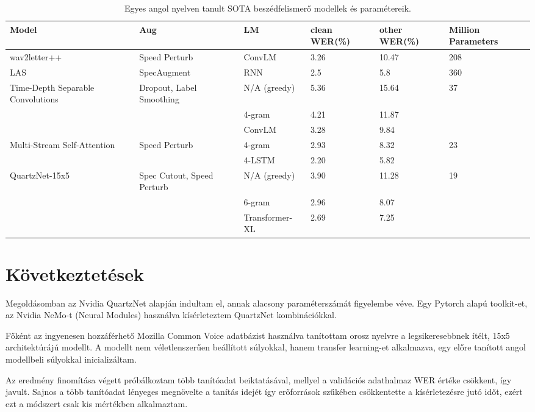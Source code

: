\begin{table}[ht]
	\footnotesize
	\centering
	\begin{tabular}{ p{2cm} p{2.5cm} p{2.5cm} p{1.5cm} p{1.5cm} p{1.5cm} }
		\toprule
		\textbf{Model} & \textbf{Aug} & \textbf{LM} & \textbf{clean WER(\%)} & \textbf{other WER(\%)} & \textbf{Million Parameters} \\
		\midrule
		wav2letter++ & Speed Perturb & ConvLM & 3.26 & 10.47 & 208 \\
		\hline
		LAS & SpecAugment & RNN & 2.5 & 5.8 & 360 \\
		\hline
		Time-Depth Separable Convolutions & Dropout, Label Smoothing & N/A (greedy) & 5.36 & 15.64 & 37 \\
		&  & 4-gram & 4.21 & 11.87 &  \\
		&  & ConvLM & 3.28 & 9.84 &  \\
		\hline
		Multi-Stream Self-Attention & Speed Perturb & 4-gram & 2.93 & 8.32 & 23  \\
		&  & 4-LSTM & 2.20 & 5.82 &  \\
		\hline
		QuartzNet-15x5 & Spec Cutout, Speed Perturb & N/A (greedy) & 3.90 & 11.28 & 19 \\
		&  & 6-gram & 2.96 & 8.07 &  \\
		&  & Transformer-XL & 2.69 & 7.25 &  \\
		\bottomrule
	\end{tabular}
	\caption{Egyes angol nyelven tanult SOTA beszédfelismerő modellek és paramétereik.}
\end{table}

\section{Következtetések}

Megoldásomban az Nvidia QuartzNet alapján indultam el, annak alacsony paraméterszámát figyelembe véve. Egy Pytorch alapú toolkit-et, az Nvidia NeMo-t (Neural Modules) használva kísérleteztem QuartzNet kombinációkkal.

Főként az ingyenesen hozzáférhető Mozilla Common Voice adatbázist használva tanítottam orosz nyelvre a legsikeresebbnek ítélt, 15x5 architektúrájú modellt. A modellt nem véletlenszerűen beállított súlyokkal, hanem transfer learning-et alkalmazva, egy előre tanított angol modellbeli súlyokkal inicializáltam.

Az eredmény finomítása végett próbálkoztam több tanítóadat beiktatásával, mellyel a validációs adathalmaz WER értéke csökkent, így javult. Sajnos a több tanítóadat lényeges megnövelte a tanítás idejét így erőforrások szűkében csökkentette a kísérletezésre jutó időt, ezért ezt a módszert csak kis mértékben alkalmaztam.
